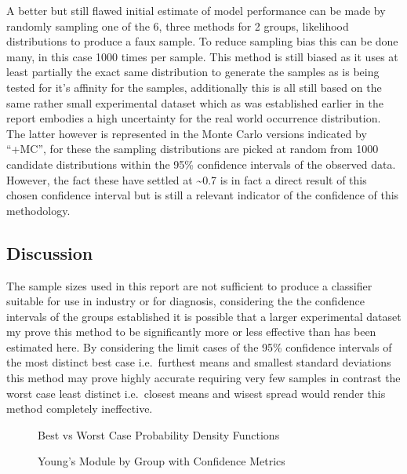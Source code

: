 \documentclass[
  paper=a4,
  ,captions=tableheading
]{scrartcl}
\makeatletter
\newcommand*\pandocbounded[1]{%
  \sbox\pandoc@box{#1}%
  \Gscale@div\@tempa{\textheight}{\dimexpr\ht\pandoc@box+\dp\pandoc@box\relax}%
  \Gscale@div\@tempb{\linewidth}{\wd\pandoc@box}%
  \ifdim\@tempb\p@<\@tempa\p@\let\@tempa\@tempb\fi%
  \ifdim\@tempa\p@<\p@\scalebox{\@tempa}{\usebox\pandoc@box}%
  \else\usebox{\pandoc@box}%
  \fi%
}
\makeatother
\begin{document}
A better but still flawed initial estimate of model performance can be
made by randomly sampling one of the 6, three methods for 2 groups,
likelihood distributions to produce a faux sample. To reduce sampling
bias this can be done many, in this case 1000 times per sample. This
method is still biased as it uses at least partially the exact same
distribution to generate the samples as is being tested for it's
affinity for the samples, additionally this is all still based on the
same rather small experimental dataset which as was established earlier
in the report embodies a high uncertainty for the real world occurrence
distribution. The latter however is represented in the Monte Carlo
versions indicated by ``+MC'', for these the sampling distributions are
picked at random from 1000 candidate distributions within the 95\%
confidence intervals of the observed data. However, the fact these have
settled at \textasciitilde0.7 is in fact a direct result of this chosen
confidence interval but is still a relevant indicator of the confidence
of this methodology.

\subsection{Discussion}\label{discussion}

The sample sizes used in this report are not sufficient to produce a
classifier suitable for use in industry or for diagnosis, considering
the the confidence intervals of the groups established it is possible
that a larger experimental dataset my prove this method to be
significantly more or less effective than has been estimated here. By
considering the limit cases of the 95\% confidence intervals of the most
distinct best case i.e.~furthest means and smallest standard deviations
this method may prove highly accurate requiring very few samples in
contrast the worst case least distinct i.e.~closest means and wisest
spread would render this method completely ineffective.

\noindent
\begin{minipage}[t]{0.48\textwidth}
\begin{figure}
\centering
\pandocbounded{}
\caption{Best vs Worst Case Probability Density Functions}
\end{figure}
\end{minipage}
\hfill
\begin{minipage}[t]{0.48\textwidth}
\begin{figure}
\centering
\pandocbounded{}
\caption{Young's Module by Group with Confidence Metrics}
\end{figure}
\end{minipage}
\end{document}
